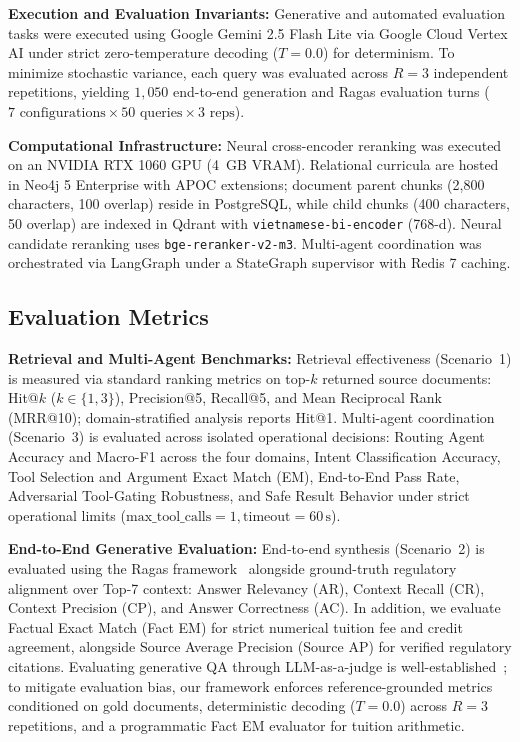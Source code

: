 \noindent\textbf{Execution and Evaluation Invariants:} Generative and automated evaluation tasks were executed using Google Gemini 2.5 Flash Lite via Google Cloud Vertex AI under strict zero-temperature decoding ($T=0.0$) for determinism. To minimize stochastic variance, each query was evaluated across $R=3$ independent repetitions, yielding $1,050$ end-to-end generation and Ragas evaluation turns ($7\text{ configurations} \times 50\text{ queries} \times 3\text{ reps}$).

\noindent\textbf{Computational Infrastructure:} Neural cross-encoder reranking was executed on an NVIDIA RTX 1060 GPU (4~GB VRAM). Relational curricula are hosted in Neo4j 5 Enterprise with APOC extensions; document parent chunks (2,800 characters, 100 overlap) reside in PostgreSQL, while child chunks (400 characters, 50 overlap) are indexed in Qdrant with \texttt{vietnamese-bi-encoder} (768-d). Neural candidate reranking uses \texttt{bge-reranker-v2-m3}. Multi-agent coordination was orchestrated via LangGraph under a StateGraph supervisor with Redis 7 caching.

\subsection{Evaluation Metrics}
\label{sec:metrics}

\noindent\textbf{Retrieval and Multi-Agent Benchmarks:} Retrieval effectiveness (Scenario~1) is measured via standard ranking metrics on top-$k$ returned source documents: Hit@$k$ ($k \in \{1, 3\}$), Precision@5, Recall@5, and Mean Reciprocal Rank (MRR@10); domain-stratified analysis reports Hit@1. Multi-agent coordination (Scenario~3) is evaluated across isolated operational decisions: Routing Agent Accuracy and Macro-F1 across the four domains, Intent Classification Accuracy, Tool Selection and Argument Exact Match (EM), End-to-End Pass Rate, Adversarial Tool-Gating Robustness, and Safe Result Behavior under strict operational limits ($\text{max\_tool\_calls}=1, \text{timeout}=60\,\text{s}$).

\noindent\textbf{End-to-End Generative Evaluation:} End-to-end synthesis (Scenario~2) is evaluated using the Ragas framework~\cite{es2023ragas} alongside ground-truth regulatory alignment over Top-7 context: Answer Relevancy (AR), Context Recall (CR), Context Precision (CP), and Answer Correctness (AC). In addition, we evaluate Factual Exact Match (Fact EM) for strict numerical tuition fee and credit agreement, alongside Source Average Precision (Source AP) for verified regulatory citations. Evaluating generative QA through LLM-as-a-judge is well-established~\cite{zheng2023judging,es2023ragas}; to mitigate evaluation bias, our framework enforces reference-grounded metrics conditioned on gold documents, deterministic decoding ($T\!=\!0.0$) across $R\!=\!3$ repetitions, and a programmatic Fact EM evaluator for tuition arithmetic.

